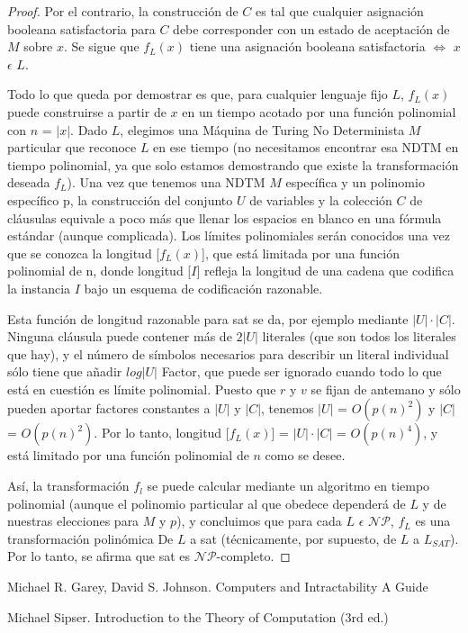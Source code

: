 \documentclass[a4paper, spanish, utf8]{memoir}
\begin{document}
\begin{proof}
  Por el contrario, la construcción de $C$ es tal que cualquier asignación
  booleana satisfactoria para $C$ debe corresponder con un estado de aceptación
  de $M$ sobre $x$. Se sigue que $f_L(x)$ tiene una asignación booleana
  satisfactoria  $\iff$ $x$ $\epsilon$ $L$.

  Todo lo que queda por demostrar es que, para cualquier lenguaje fijo $L$,
  $f_L(x)$ puede construirse a partir de $x$ en un tiempo acotado por una
  función polinomial con $n$ = $|x|$. Dado $L$, elegimos una Máquina de Turing
  No Determinista $M$ particular que reconoce $L$ en ese tiempo (no necesitamos
  encontrar esa NDTM en tiempo polinomial, ya que solo estamos demostrando que
  existe la transformación deseada $f_L$). Una vez que tenemos una NDTM $M$
  específica y un polinomio específico p, la construcción del conjunto $U$ de
  variables y la colección $C$ de cláusulas equivale a poco más que llenar los
  espacios en blanco en una fórmula estándar (aunque complicada). Los límites
  polinomiales serán conocidos una vez que se conozca la longitud [$f_L(x)$],
  que está limitada por una función polinomial de n, donde longitud [$I$]
  refleja la longitud de una cadena que codifica la instancia $I$ bajo un
  esquema de codificación razonable.

  Esta función de longitud razonable para \gls{sat} se da, por ejemplo mediante $|U|
  \cdot |C|$. Ninguna cláusula puede contener más de $2|U|$ literales (que son
  todos los literales que hay), y el número de símbolos necesarios para
  describir un literal individual sólo tiene que añadir $log|U|$ Factor, que
  puede ser ignorado cuando todo lo que está en cuestión es límite polinomial.
  Puesto que $r$ y $v$ se fijan de antemano y sólo pueden aportar factores
  constantes a $|U|$ y $|C|$, tenemos $|U|$ = $O(p(n)^2)$ y $|C|$ = $O(p(n)^2)$.
  Por lo tanto, longitud [$f_L(x)$] = $|U|\cdot|C|$ = $O(p(n)^4)$, y está
  limitado por una función polinomial de $n$ como se desee.

  Así, la transformación $f_{l}$ se puede calcular mediante un algoritmo en
  tiempo polinomial (aunque el polinomio particular al que obedece dependerá de
  $L$ y de nuestras elecciones para $M$ y $p$), y concluimos que para cada $L$
  $\epsilon$ $\mathcal{NP}$, $f_L$ es una transformación polinómica De $L$ a \gls{sat}
  (técnicamente, por supuesto, de $L$ a $L_{SAT}$). Por lo tanto, se afirma que
  \gls{sat} es $\mathcal{NP}$-completo.
\end{proof}

\clearpage







\footnotesize{
\begin{thebibliography}{99}

 Michael R. Garey, David S. Johnson.
\newblock Computers and Intractability A Guide

 Michael Sipser.
\newblock  Introduction to the Theory of Computation (3rd ed.)

\end{thebibliography}
}
\end{document}
